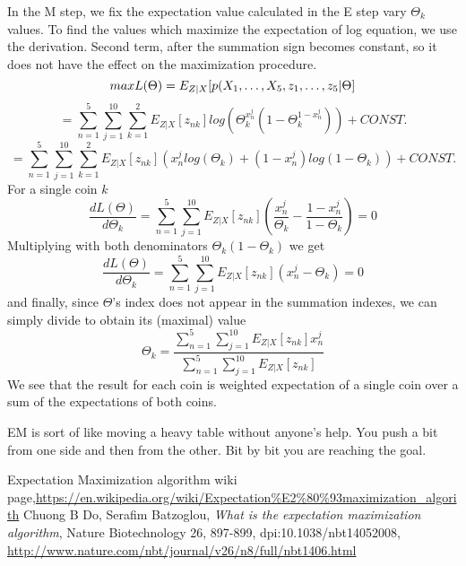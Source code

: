 \documentclass[11pt]{article}
\theoremstyle{plain}
\theoremstyle{definition}
\begin{document}
In the M step, we fix the expectation value calculated in the E step vary $\Theta_k$ values. To find the values which maximize the expectation of log equation, we use the derivation. Second term, after the summation sign becomes constant, so it does not have the effect on the maximization procedure.
\begin{equation}
maxL(\Theta)=E_{Z|X}[p(X_1,\dots, X_5,\boldmath{z_1,\dots,z_5}|\Theta]
\end{equation}
\begin{equation}
=\sum_{n=1}^{5}\sum_{j=1}^{10}\sum_{k=1}^{2}E_{Z|X}[z_{nk}]log(\Theta_k^{x_n^j}(1-\Theta_k^{1-x_n^j}))+CONST.
\end{equation}
\begin{equation}
=\sum_{n=1}^{5}\sum_{j=1}^{10}\sum_{k=1}^{2}E_{Z|X}[z_{nk}]({x_n^j}log(\Theta_k)+({1-x_n^j})log(1-\Theta_k))+CONST.
\end{equation}
For a single coin $k$
\begin{equation}
\frac{dL(\Theta)}{d\Theta_k}=\sum_{n=1}^{5}\sum_{j=1}^{10}E_{Z|X}[z_{nk}](\frac{x_n^j}{\Theta_k}-\frac{1-x_n^j}{1-\Theta_k})=0
\end{equation}
Multiplying with both denominators $\Theta_k(1-\Theta_k)$ we get
\begin{equation}
\frac{dL(\Theta)}{d\Theta_k}=\sum_{n=1}^{5}\sum_{j=1}^{10}E_{Z|X}[z_{nk}]({x_n^j}-{\Theta_k})=0
\end{equation}
and finally, since $\Theta$'s index does not appear in the summation indexes, we can simply divide to obtain its (maximal) value
\begin{equation}
\Theta_k=\frac{\sum_{n=1}^{5}\sum_{j=1}^{10}E_{Z|X}[z_{nk}]{x_n^j}}{\sum_{n=1}^{5}\sum_{j=1}^{10}E_{Z|X}[z_{nk}]}
\end{equation}
We see that the result for each coin is weighted expectation of a single coin over a sum of the expectations of both coins.

EM is sort of like moving a heavy table without anyone's help. You push a bit from one side and then from the other. Bit by bit you are reaching the goal.
\begin{thebibliography}{} 
 Expectation Maximization algorithm wiki page,\url{https://en.wikipedia.org/wiki/Expectation%E2%80%93maximization_algorith}
 Chuong B Do,  Serafim Batzoglou, \emph{What is the expectation maximization algorithm}, Nature Biotechnology 26, 897-899, dpi:10.1038/nbt14052008, \url{http://www.nature.com/nbt/journal/v26/n8/full/nbt1406.html}

\end{thebibliography}
\end{document}
